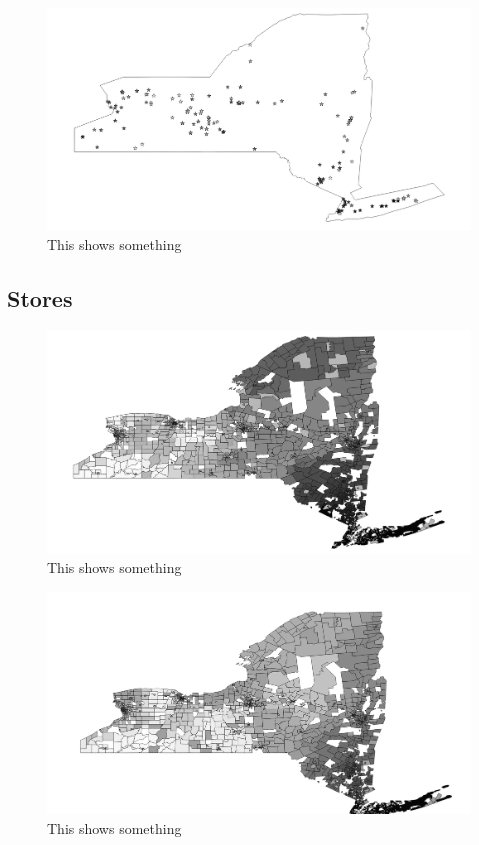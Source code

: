 \documentclass{report}
\begin{document}
\begin{figure}
\centering
\begin{framed}
\includegraphics[scale=.4]{procs_243_69}
\caption{This shows something}
\end{framed}
\end{figure}

\subsection{Stores}

\begin{figure}
\centering
\begin{framed}
\includegraphics[scale=.4]{stores_243_49}
\caption{This shows something}
\end{framed}
\end{figure}

\begin{figure}
\centering
\begin{framed}
\includegraphics[scale=.4]{stores_243_66}
\caption{This shows something}
\end{framed}
\end{figure}
\end{document}
